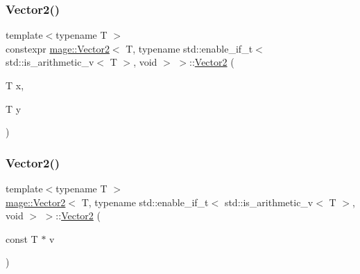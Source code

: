 \subsubsection{\texorpdfstring{Vector2()}{Vector2()}\hspace{0.1cm}{\footnotesize\ttfamily [2/6]}}
{\footnotesize\ttfamily template$<$typename T $>$ \\
constexpr \hyperlink{structmage_1_1_vector2}{mage\+::\+Vector2}$<$ T, typename std\+::enable\+\_\+if\+\_\+t$<$ std\+::is\+\_\+arithmetic\+\_\+v$<$ T $>$, void $>$ $>$\+::\hyperlink{structmage_1_1_vector2}{Vector2} (\begin{DoxyParamCaption}\item[{T}]{x,  }\item[{T}]{y }\end{DoxyParamCaption})\hspace{0.3cm}{\ttfamily [noexcept]}}

\hypertarget{structmage_1_1_vector2_3_01_t_00_01typename_01std_1_1enable__if__t_3_01std_1_1is__arithmetic__v_3_01_t_01_4_00_01void_01_4_01_4_a57dfdee698c1846041c9867a211520ff}{}\label{structmage_1_1_vector2_3_01_t_00_01typename_01std_1_1enable__if__t_3_01std_1_1is__arithmetic__v_3_01_t_01_4_00_01void_01_4_01_4_a57dfdee698c1846041c9867a211520ff} 
\subsubsection{\texorpdfstring{Vector2()}{Vector2()}\hspace{0.1cm}{\footnotesize\ttfamily [3/6]}}
{\footnotesize\ttfamily template$<$typename T $>$ \\
\hyperlink{structmage_1_1_vector2}{mage\+::\+Vector2}$<$ T, typename std\+::enable\+\_\+if\+\_\+t$<$ std\+::is\+\_\+arithmetic\+\_\+v$<$ T $>$, void $>$ $>$\+::\hyperlink{structmage_1_1_vector2}{Vector2} (\begin{DoxyParamCaption}\item[{const T $\ast$}]{v }\end{DoxyParamCaption})\hspace{0.3cm}{\ttfamily [noexcept]}}

